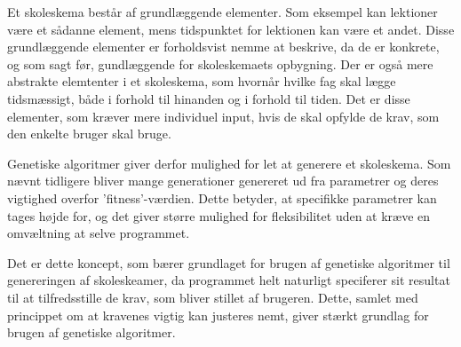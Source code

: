 Et skoleskema består af grundlæggende elementer. Som eksempel kan lektioner være et sådanne element, mens tidspunktet for lektionen kan være et andet. Disse grundlæggende elementer er forholdsvist nemme at beskrive, da de er konkrete, og som sagt før, gundlæggende for skoleskemaets opbygning. Der er også mere abstrakte elemtenter i et skoleskema, som hvornår hvilke fag skal lægge tidsmæssigt, både i forhold til hinanden og i forhold til tiden. Det er disse elementer, som kræver mere individuel input, hvis de skal opfylde de krav, som den enkelte bruger skal bruge.

Genetiske algoritmer giver derfor mulighed for let at generere et skoleskema. Som nævnt tidligere bliver mange generationer genereret ud fra parametrer og deres vigtighed overfor 'fitness'-værdien. Dette betyder, at specifikke parametrer kan tages højde for, og det giver større mulighed for fleksibilitet uden at kræve en omvæltning at selve programmet. 

Det er dette koncept, som bærer grundlaget for brugen af genetiske algoritmer til genereringen af skoleskeamer, da programmet helt naturligt speciferer sit resultat til at tilfredsstille de krav, som bliver stillet af brugeren. Dette, samlet med princippet om at kravenes vigtig kan justeres nemt, giver stærkt grundlag for brugen af genetiske algoritmer.

